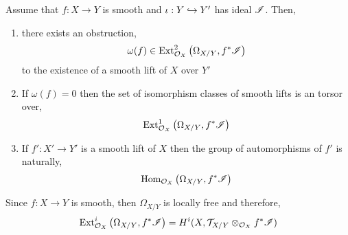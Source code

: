 \documentclass[12pt]{article}
\begin{document}
\begin{prop}
Assume that $f : X \to Y$ is smooth and $\iota : Y \hookrightarrow Y'$ has ideal $\mathscr{I}$. Then,
\begin{enumerate}
\item there exists an obstruction,
\[ \omega(f) \in \mathrm{Ext}^{2}_{\mathcal{O}_{X}} \left( \Omega_{X/Y}, f^*\mathscr{I} \right) \]
to the existence of a smooth lift of $X$ over $Y'$
\item If $\omega(f) = 0$ then the set of isomorphism classes of smooth lifts is an torsor over,
\[ \mathrm{Ext}^{1}_{\mathcal{O}_{X}} \left( \Omega_{X/Y}, f^* \mathscr{I} \right) \]
\item If $f' : X' \to Y'$ is a smooth lift of $X$ then the group of automorphisms of $f'$ is naturally, 
\[ \mathrm{Hom}_{\mathcal{O}_{X}} \left( \Omega_{X/Y}, f^* \mathscr{I} \right) \]
\end{enumerate}
\end{prop}

\newcommand{\Zar}{\mathrm{Zar}}

\begin{rmk}
Since $f : X \to Y$ is smooth, then $\Omega_{X/Y}$ is locally free and therefore,
\[ \mathrm{Ext}^{i}_{\mathcal{O}_{X}} \left( \Omega_{X/Y}, f^* \mathscr{I} \right) = H^i(X, \mathcal{T}_{X/Y} \otimes_{\mathcal{O}_{X}} f^* \mathscr{I}) \]
\end{rmk}
\end{document}
